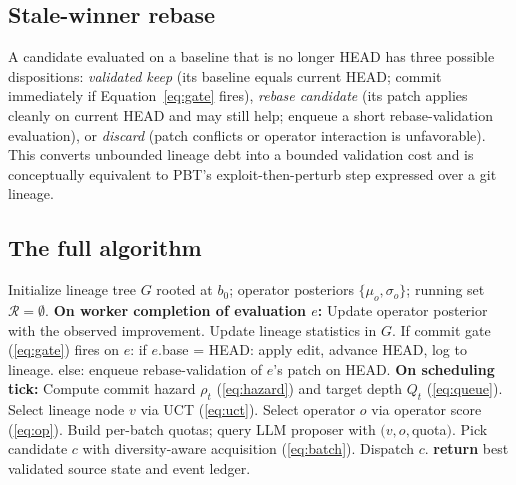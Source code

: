 \documentclass{article}
\newcommand{\alps}{ALPS\xspace}
\begin{document}
\subsection{Stale-winner rebase}
\label{sec:alps:stale}

A candidate evaluated on a baseline that is no longer HEAD has three possible dispositions: \emph{validated keep} (its baseline equals current HEAD; commit immediately if Equation~\ref{eq:gate} fires), \emph{rebase candidate} (its patch applies cleanly on current HEAD and may still help; enqueue a short rebase-validation evaluation), or \emph{discard} (patch conflicts or operator interaction is unfavorable). This converts unbounded lineage debt into a bounded validation cost and is conceptually equivalent to PBT's exploit-then-perturb step \citep{pbt} expressed over a git lineage.

\subsection{The full algorithm}

\begin{algorithm}[t]
\caption{\alps: adaptive lineage-aware parallel search}
\label{alg:alps}
\begin{algorithmic}[1]
\STATE Initialize lineage tree $G$ rooted at $b_0$; operator posteriors $\{\mu_o,\sigma_o\}$; running set $\mathcal{R} = \emptyset$.
  \STATE \textbf{On worker completion of evaluation $e$:}
  \STATE \quad Update operator posterior with the observed improvement.
  \STATE \quad Update lineage statistics in $G$.
  \STATE \quad If commit gate (\ref{eq:gate}) fires on $e$:
  \STATE \qquad if $e$.base = HEAD: apply edit, advance HEAD, log to lineage.
  \STATE \qquad else: enqueue rebase-validation of $e$'s patch on HEAD.
  \STATE \textbf{On scheduling tick:}
  \STATE \quad Compute commit hazard $\rho_t$ (\ref{eq:hazard}) and target depth $Q_t$ (\ref{eq:queue}).
    \STATE Select lineage node $v$ via UCT (\ref{eq:uct}).
    \STATE Select operator $o$ via operator score (\ref{eq:op}).
    \STATE Build per-batch quotas; query LLM proposer with $(v, o, $quota$)$.
    \STATE Pick candidate $c$ with diversity-aware acquisition (\ref{eq:batch}).
    \STATE Dispatch $c$.
  \ENDWHILE
\ENDWHILE
\STATE \textbf{return} best validated source state and event ledger.
\end{algorithmic}
\end{algorithm}
\end{document}
